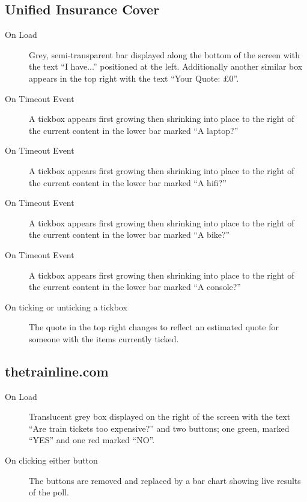 \subsection{Unified Insurance Cover}
	\begin{description}
		\item[On Load]{Grey, semi-transparent bar displayed along the bottom of the screen with the text ``I have...'' positioned at the left. Additionally another similar box appears in the top right with the text ``Your Quote: £0''.}
		\item[On Timeout Event]{A tickbox appears first growing then shrinking into place to the right of the current content in the lower bar marked ``A laptop?''}
		\item[On Timeout Event]{A tickbox appears first growing then shrinking into place to the right of the current content in the lower bar marked ``A hifi?''}
		\item[On Timeout Event]{A tickbox appears first growing then shrinking into place to the right of the current content in the lower bar marked ``A bike?''}
		\item[On Timeout Event]{A tickbox appears first growing then shrinking into place to the right of the current content in the lower bar marked ``A console?''}
		\item[On ticking or unticking a tickbox]{The quote in the top right changes to reflect an estimated quote for someone with the items currently ticked.}
	\end{description}
\subsection{thetrainline.com}
	\begin{description}
		\item[On Load]{Translucent grey box displayed on the right of the screen with the text ``Are train tickets too expensive?'' and two buttons; one green, marked ``YES'' and one red marked ``NO''.}
		\item[On clicking either button]{The buttons are removed and replaced by a bar chart showing live results of the poll.}
	\end{description}
